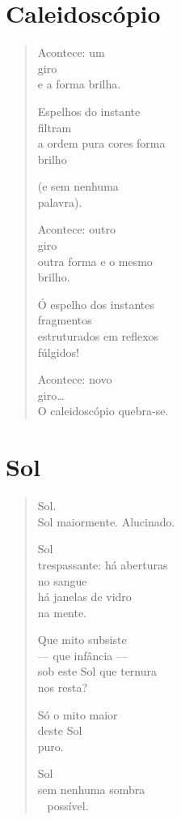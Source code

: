\chapter{Caleidoscópio}

\begin{verse}
Acontece: um\\
\qquad\qquad\mbox{} giro\\
\qquad\qquad\mbox{} e a forma brilha.

Espelhos do instante\\
\qquad\qquad\qquad\qquad filtram\\
a ordem pura cores forma\\
\qquad\qquad\qquad\qquad brilho

(e sem nenhuma\\
\qquad\qquad\mbox{}palavra).

Acontece: outro\\
\qquad\qquad\quad giro\\
\qquad\qquad\quad outra forma e o mesmo\\
\qquad\qquad\qquad\qquad\qquad\qquad brilho.

Ó espelho dos instantes\\
\qquad\qquad\quad fragmentos\\
estruturados em reflexos\\
\qquad\qquad\qquad\mbox{} fúlgidos!

Acontece: novo\\
\qquad\qquad\mbox{} giro\ldots{}\\
O caleidoscópio quebra-se.
\end{verse}

\chapter{Sol}

\begin{verse}
Sol.\\
Sol maiormente. Alucinado.

Sol\\
trespassante: há aberturas\\
\qquad\qquad\qquad\quad no sangue\\
\qquad\qquad\qquad\quad há janelas de vidro\\
\qquad\qquad\qquad\quad na mente.

Que mito subsiste\\
---  que infância ---\\
sob este Sol que ternura\\
\qquad\qquad\qquad nos resta?

Só o mito maior\\
deste Sol\\
puro.

Sol\\
sem nenhuma sombra\\
\qquad\qquad\quad\mbox{ } possível.
\end{verse}

